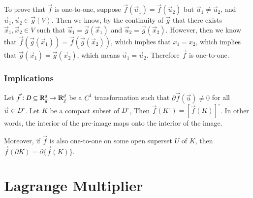 \documentclass [12 pt, twoside] {book}
\newcommand\+{\text{ }}
\begin{document}
To prove that $\vec{f}$ is one-to-one, suppose $\vec{f}(\vec{u}_1) =
\vec{f}(\vec{u}_2)$ but $\vec{u}_1 \neq \vec{u}_2$, and $\vec{u}_1, \vec{u}_2
\in \vec{g}(V)$. Then we know, by the continuity of $\vec{g}$ that there exists
$\vec{x}_1, \vec{x}_2 \in V$ such that $\vec{u}_1 = \vec{g}(\vec{x}_1)$ and
$\vec{u}_2 = \vec{g}(\vec{x}_2)$. However, then we know that
$\vec{f}(\vec{g}(\vec{x}_1)) = \vec{f}(\vec{g}(\vec{x}_2))$, which implies that
$x_1 = x_2$, which implies that $\vec{g}(\vec{x}_1) = \vec{g}(\vec{x}_2)$, which
means $\vec{u}_1 = \vec{u}_2$. Therefore $\vec{f}$ is one-to-one.

\subsubsection{Implications}

Let $\vec{f}: D \subseteq \varmathbb{R}^d_{\vec{u}} \to
\varmathbb{R}^d_{\vec{x}}$ be a $C^1$ transformation such that $\partial
\vec{f}(\vec{u}) \neq 0$ for all $\vec{u} \in D^\circ$. Let $K$ be a compact
subset of $D^\circ$, Then $\vec{f}(K^\circ) = [\vec{f}(K)]^\circ$. In other
words, the interior of the pre-image maps onto the interior of the image.

Moreover, if $\vec{f}$ is also one-to-one on some open superset $U$ of $K$, then
$\vec{f}(\partial K) = \partial \{\vec{f}(K)\}$.
\section{Lagrange Multiplier}
\end{document}
